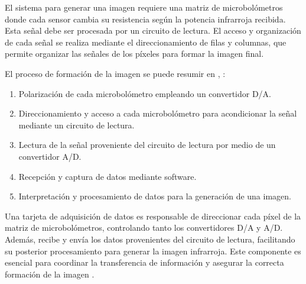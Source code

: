 El sistema para generar una imagen requiere una matriz de microbolómetros donde cada sensor cambia su resistencia según la potencia infrarroja recibida. Esta señal debe ser procesada por un circuito de lectura. El acceso y organización de cada señal se realiza mediante el direccionamiento de filas y columnas, que permite organizar las señales de los píxeles para formar la imagen final.


El proceso de formación de la imagen se puede resumir en \cite{BlancoMDA}, \cite{Hernandez2021}:
\begin{enumerate}
 \item Polarización de cada microbolómetro empleando un convertidor D/A.
 \item Direccionamiento y acceso a cada microbolómetro para acondicionar la señal mediante un circuito de lectura.
 \item Lectura de la señal proveniente del circuito de lectura por medio de un convertidor A/D.
 \item Recepción y captura de datos mediante software.
 \item Interpretación y procesamiento de datos para la generación de una imagen.
\end{enumerate}


Una tarjeta de adquisición de datos es responsable de direccionar cada píxel de la matriz de microbolómetros, controlando tanto los convertidores D/A y A/D. Además, recibe y envía los datos provenientes del circuito de lectura, facilitando su posterior procesamiento para generar la imagen infrarroja. Este componente es esencial para coordinar la transferencia de información y asegurar la correcta formación de la imagen \cite{Hernandez2021}.